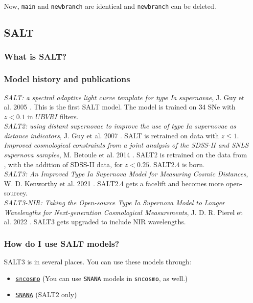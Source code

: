 Now, \texttt{main} and \texttt{newbranch} are identical and \texttt{newbranch} can be deleted.

\subsection{SALT}
\subsubsection{What is SALT?}


\subsubsection{Model history and publications}
\textit{SALT: a spectral adaptive light curve template for type Ia supernovae}, J. Guy et al. 2005 \cite{salt}. This is the first SALT model. The model is trained on 34 SNe with $z < 0.1$ in $UBVRI$ filters. \\

\textit{SALT2: using distant supernovae to improve the use of type Ia supernovae as distance indicators}, J. Guy et al. 2007 \cite{salt2}. SALT is retrained on data with $z \leq 1$. \\

\textit{Improved cosmological constraints from a joint analysis of the SDSS-II and SNLS supernova samples}, M. Betoule et al. 2014 \cite{salt2.4}. SALT2 is retrained on the data from \cite{salt2}, with the addition of SDSS-II data, for $z < 0.25$. SALT2.4 is born. \\

\textit{SALT3: An Improved Type Ia Supernova Model for Measuring Cosmic Distances}, W. D. Kenworthy et al. 2021 \cite{salt3}. SALT2.4 gets a facelift and becomes more open-sourcey. \\

\textit{SALT3-NIR: Taking the Open-source Type Ia Supernova Model to Longer Wavelengths for Next-generation Cosmological Measurements}, J. D. R. Pierel et al. 2022 \cite{salt3nir}. SALT3 gets upgraded to include NIR wavelengths. 

\subsubsection{How do I use SALT models?}
SALT3 is in several places. You can use these models through:
\begin{itemize}
    \item \href{https://sncosmo.readthedocs.io/en/stable/}{\texttt{sncosmo}} (You can use \texttt{SNANA} models in \texttt{sncosmo}, as well.)
    \item \href{https://github.com/RickKessler/SNANA}{\texttt{SNANA}} (SALT2 only)
\end{itemize}

